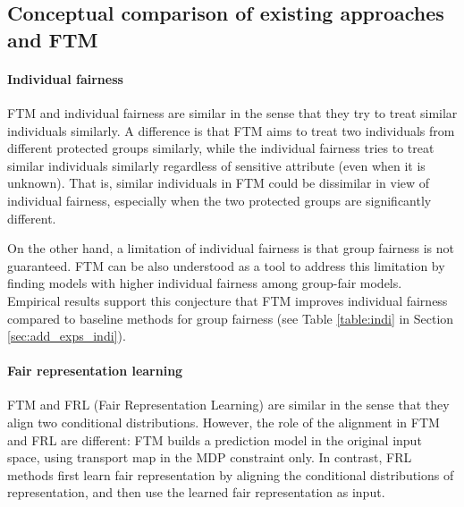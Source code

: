 \documentclass[10pt]{article} %
\begin{document}

\subsection{Conceptual comparison of existing approaches and FTM}\label{sec:compare}

\paragraph{Individual fairness}
FTM and individual fairness are similar in the sense that they try to treat similar individuals similarly.
A difference is that FTM aims to treat two individuals from different protected groups similarly, while the individual fairness tries to treat similar individuals similarly regardless of sensitive attribute (even when it is unknown).
That is, similar individuals in FTM could be dissimilar in view of individual fairness, especially when the two protected groups are significantly different. 

On the other hand, a limitation of individual fairness is that group fairness is not guaranteed.
FTM can be also understood as a tool to address this limitation by finding models with higher individual fairness among group-fair models.
Empirical results support this conjecture that FTM improves individual fairness compared to baseline methods for group fairness (see Table \ref{table:indi} in Section \ref{sec:add_exps_indi}).



\paragraph{Fair representation learning}

FTM and FRL (Fair Representation Learning) are similar in the sense that they align two conditional distributions.
However, the role of the alignment in FTM and FRL are different:
FTM builds a prediction model in the original input space, using transport map in the MDP constraint only.
In contrast, FRL methods first learn fair representation by aligning the conditional distributions of representation, and then use the learned fair representation as input.
\end{document}
